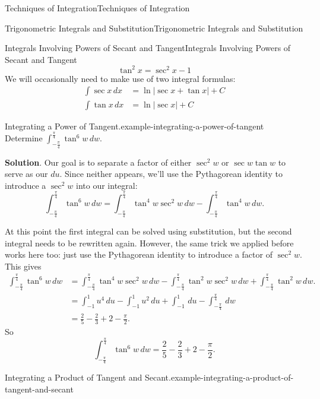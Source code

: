 \documentclass[10pt,]{book}
\numberwithin{equation}{section}
\begin{document}
\begin{chapterptx}{Techniques of Integration}{}{Techniques of Integration}{}{}
\begin{sectionptx}{Trigonometric Integrals and Substitution}{}{Trigonometric Integrals and Substitution}{}{}
\begin{subsectionptx}{Integrals Involving Powers of Secant and Tangent}{}{Integrals Involving Powers of Secant and Tangent}{}{}
\begin{equation*}
\tan^{2}x = \sec^{2}x - 1 
\end{equation*}
We will occasionally need to make use of two integral formulas:%
\begin{align*}
\int\sec x\,dx & = \ln|\sec x + \tan x| + C \\
\int\tan x\,dx & = \ln|\sec x| + C 
\end{align*}
%
\begin{example}{Integrating a Power of Tangent.}{example-integrating-a-power-of-tangent}%
\hypertarget{p-532}{}%
Determine \(\int_{-\frac{\pi}{4}}^{\frac{\pi}{4}}\tan^{6}w\,dw\).%
\par\smallskip%
\noindent\textbf{Solution}.\hypertarget{solution-117}{}\quad%
\hypertarget{p-533}{}%
Our goal is to separate a factor of either \(\sec^{2}w\) or \(\sec w\tan w\) to serve as our \(du\). Since neither appears, we'll use the Pythagorean identity to introduce a \(\sec^{2}w\) into our integral:%
\begin{equation*}
\int_{-\frac{\pi}{4}}^{\frac{\pi}{4}}\tan^{6}w\,dw = \int_{-\frac{\pi}{4}}^{\frac{\pi}{4}}\tan^{4}w\sec^{2}w\,dw - \int_{-\frac{\pi}{4}}^{\frac{\pi}{4}}\tan^{4}w\,dw.
\end{equation*}
%
\par
\hypertarget{p-534}{}%
At this point the first integral can be solved using substitution, but the second integral needs to be rewritten again. However, the same trick we applied before works here too: just use the Pythagorean identity to introduce a factor of \(\sec^{2}w\). This gives%
\begin{align*}
\int_{-\frac{\pi}{4}}^{\frac{\pi}{4}}\tan^{6}w\,dw & = \int_{-\frac{\pi}{4}}^{\frac{\pi}{4}}\tan^{4}w\sec^{2}w\,dw - \int_{-\frac{\pi}{4}}^{\frac{\pi}{4}}\tan^{2}w\sec^{2}w\,dw + \int_{-\frac{\pi}{4}}^{\frac{\pi}{4}}\tan^{2}w\,dw.\\
& = \int_{-1}^{1}u^{4}\,du - \int_{-1}^{1}u^{2}\,du + \int_{-1}^{1}\,du - \int_{-\frac{\pi}{4}}^{\frac{\pi}{4}}\,dw \\
& = \frac{2}{5} - \frac{2}{3} + 2 - \frac{\pi}{2}. 
\end{align*}
So%
\begin{equation*}
\int_{-\frac{\pi}{4}}^{\frac{\pi}{4}}\tan^{6}w\,dw = \frac{2}{5} - \frac{2}{3} + 2 - \frac{\pi}{2}.
\end{equation*}
%
\end{example}
\begin{example}{Integrating a Product of Tangent and Secant.}{example-integrating-a-product-of-tangent-and-secant}%

\end{example}
\end{subsectionptx}
\end{sectionptx}
\end{chapterptx}
\end{document}

